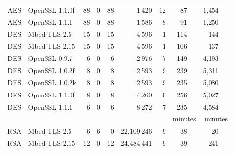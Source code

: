 \begin{table}
\begin{tabular}{clrrrrrrr}
        AES                & OpenSSL 1.1.0f           & 88                    & 0                   & 88                   & 1,420       & 12   & 87 ~~      & 1,454 ~~        \\
        AES                & OpenSSL 1.1.1            & 88                    & 0                   & 88                   & 1,586       & 8    & 91 ~~      & 1,250 ~~        \\
        DES                & Mbed TLS 2.5             & 15                    & 0                   & 15                   & 4,596       & 1    & 114 ~~     & 144 ~~          \\
        DES                & Mbed TLS 2.15            & 15                    & 0                   & 15                   & 4,596       & 1    & 106 ~~     & 137 ~~          \\
        DES                & OpenSSL 0.9.7            & 6                     & 0                   & 6                    & 2,976       & 7    & 149 ~~     & 4,193       ~~  \\
        DES                & OpenSSL 1.0.2f           & 8                     & 0                   & 8                    & 2,593       & 9    & 239 ~~     & 5,311       ~~  \\
        DES                & OpenSSL 1.0.2k           & 8                     & 0                   & 8                    & 2,593       & 9    & 235 ~~     & 5,080        ~~ \\
        DES                & OpenSSL 1.1.0f           & 8                     & 0                   & 8                    & 4,260       & 9    & 256 ~~     & 5,027        ~~ \\
        DES                & OpenSSL 1.1.1            & 6                     & 0                   & 6                    & 8,272       & 7    & 235 ~~     & 4,584       ~~  \\
                           &                          &                       &                     &                      &             &      & minutes    & minutes         \\\cline{8-9}
        RSA                & Mbed TLS 2.5             & 6                     & 6                   & 0                    & 22,109,246  & 9    & 38 ~~      & 20  ~~          \\
        RSA                & Mbed TLS 2.15            & 12                    & 0                   & 12                   & 24,484,441  & 9    & 39 ~~      & 241  ~~         \\

\end{tabular}
\end{table}
